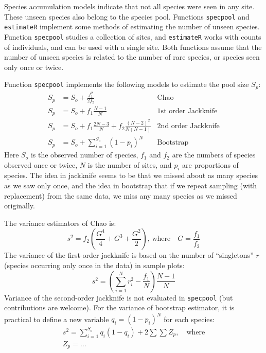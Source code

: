 \documentclass[a4paper,10pt]{amsart}
\begin{document}
Species accumulation models indicate that not all species were seen in
any site.  These unseen species also belong to the species pool.
Functions \texttt{specpool} and \texttt{estimateR} implement some
methods of estimating the number of unseen species.  Function
\texttt{specpool} studies a collection of sites, and
\texttt{estimateR} works with counts of individuals, and can be used
with a single site.  Both functions assume that the number of unseen
species is related to the number of rare species, or species seen only
once or twice.

Function \texttt{specpool} implements the following models to estimate
the pool size $S_p$:
\begin{align}
S_p &= S_o + \frac{f_1^2}{2 f_2} & \text{Chao}\\
S_p &= S_o + f_1 \frac{N-1}{N} & \text{1st order Jackknife}\\
S_p & = S_o + f_1 \frac{2N-3}{N} + f_2 \frac{(N-2)^2}{N(N-1)} &
\text{2nd order Jackknife}\\
S_p &= S_o + \sum_{i=1}^{S_o} (1-p_i)^N & \text{Bootstrap}
\end{align}
Here $S_o$ is the observed number of species, $f_1$ and $f_2$ are the
numbers of species observed once or twice, $N$ is the number of sites,
and $p_i$ are proportions of species.  The idea in jackknife seems to
be that we missed about as many species as we saw only once, and the
idea in bootstrap that if we repeat sampling (with replacement) from
the same data, we miss any many species as we missed originally.

The variance estimators of Chao is:
\begin{equation}
s^2 = f_2 \left(\frac{G^4}{4} + G^3 + \frac{G^2}{2} \right), \,
\text{where}\quad G = \frac{f_1}{f_2}
\end{equation}
The variance of the first-order jackknife is based on the number of
``singletons'' $r$ (species occurring only once in the data) in sample
plots:
\begin{equation}
s^2 = \left(\sum_{i=1}^N r_i^2 - \frac{f_1}{N}\right) \frac{N-1}{N}
\end{equation}
Variance of the second-order jackknife is not evaluated in
\texttt{specpool} (but contributions are welcome).
For the variance of bootstrap estimator, it is practical to define a
new variable $q_i = (1-p_i)^N$ for each species:
\begin{equation}
\begin{split}
s^2 = \sum_{i=1}^{S_o} q_i (1-q_i) + 2 \sum \sum Z_p , \quad \text{where} \\
Z_p = \dots
\end{split}
\end{equation}
\end{document}

